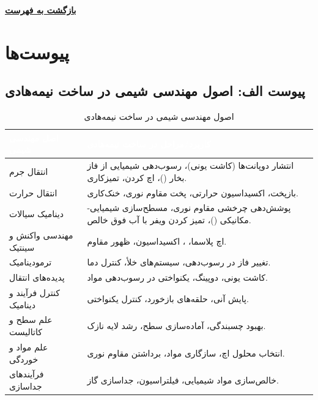 \documentclass[10pt]{report}
\newcommand{\lat}[1]{\lr{#1}}
\newcommand{\returnhome}{\vspace{0.5em}\noindent\protect\hyperlink{home}{\colorbox{conceptBox}{\color{headerColor}\textbf{بازگشت به فهرست}}}\par}
\begin{document}
\returnhome
\section{پیوست‌ها}

\subsection{پیوست الف: اصول مهندسی شیمی در ساخت نیمه‌هادی}

\begin{table}[H]
\centering
\caption{اصول مهندسی شیمی در ساخت نیمه‌هادی}
\label{tab:chem_eng_principles}
\begin{threeparttable}
\begin{tabularx}{\textwidth}{H{3.5cm} X}
\toprule
{}
\textcolor{white}{\textbf{اصل مهندسی شیمی}} & \textcolor{white}{\textbf{کاربرد/مراحل در ساخت نیمه‌هادی}} \\
\midrule
{}
انتقال جرم & انتشار دوپانت‌ها (کاشت یونی)، رسوب‌دهی شیمیایی از فاز بخار (\lat{CVD})، اچ کردن، تمیزکاری. \\
انتقال حرارت & بازپخت، اکسیداسیون حرارتی، پخت مقاوم نوری، خنک‌کاری. \\
دینامیک سیالات & پوشش‌دهی چرخشی مقاوم نوری، مسطح‌سازی شیمیایی-مکانیکی (\lat{CMP})، تمیز کردن ویفر با آب فوق خالص. \\
مهندسی واکنش و سینتیک & اچ پلاسما، \lat{CVD}، اکسیداسیون، ظهور مقاوم. \\
ترمودینامیک & تغییر فاز در رسوب‌دهی، سیستم‌های خلأ، کنترل دما. \\
پدیده‌های انتقال & کاشت یونی، دوپینگ، یکنواختی در رسوب‌دهی مواد. \\
کنترل فرآیند و دینامیک & پایش آنی، حلقه‌های بازخورد، کنترل یکنواختی. \\
علم سطح و کاتالیست & بهبود چسبندگی، آماده‌سازی سطح، رشد لایه نازک. \\
علم مواد و خوردگی & انتخاب محلول اچ، سازگاری مواد، برداشتن مقاوم نوری. \\
فرآیندهای جداسازی & خالص‌سازی مواد شیمیایی، فیلتراسیون، جداسازی گاز. \\
\bottomrule
\end{tabularx}
\end{threeparttable}
\end{table}
\end{document}
